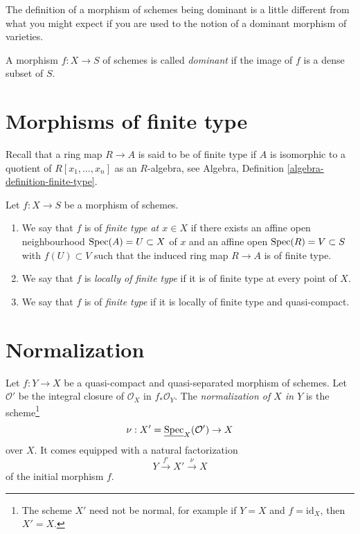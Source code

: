 \noindent
The definition of a morphism of schemes being dominant is a little
different from what you might expect if you are used to the notion
of a dominant morphism of varieties.

\begin{definition}
\label{definition-dominant}
A morphism $f : X \to S$ of schemes is called {\it dominant} if the
image of $f$ is a dense subset of $S$.
\end{definition}

\section{Morphisms of finite type}
\label{section-finite-type}

\noindent
Recall that a ring map $R \to A$ is said to be of finite type if
$A$ is isomorphic to a quotient of $R[x_1, \ldots, x_n]$ as an $R$-algebra, see
Algebra, Definition \ref{algebra-definition-finite-type}.

\begin{definition}
\label{definition-finite-type}
Let $f : X \to S$ be a morphism of schemes.
\begin{enumerate}
\item We say that $f$ is of {\it finite type at $x \in X$} if
there exists an affine open neighbourhood $\mathop{\mathrm{Spec}}(A) = U \subset X$
of $x$ and an affine open $\mathop{\mathrm{Spec}}(R) = V \subset S$
with $f(U) \subset V$ such that the induced ring map
$R \to A$ is of finite type.
\item We say that $f$ is {\it locally of finite type} if it is
of finite type at every point of $X$.
\item We say that $f$ is of {\it finite type} if it is locally of
finite type and quasi-compact.
\end{enumerate}
\end{definition}

\section{Normalization}
\label{section-normalization}

\begin{definition}
\label{definition-normalization-X-in-Y}
Let $f : Y \to X$ be a quasi-compact and quasi-separated morphism of schemes.
Let $\mathcal{O}'$ be the integral closure of $\mathcal{O}_X$ in
$f_*\mathcal{O}_Y$. The {\it normalization of $X$ in $Y$} is the
scheme\footnote{The scheme $X'$ need not be normal, for example if
$Y = X$ and $f = \text{id}_X$, then $X' = X$.}
$$
\nu : X' = \underline{\mathop{\mathrm{Spec}}}_X(\mathcal{O}') \to X
$$
over $X$. It comes equipped with a natural factorization
$$
Y \xrightarrow{f'} X' \xrightarrow{\nu} X
$$
of the initial morphism $f$.
\end{definition}

